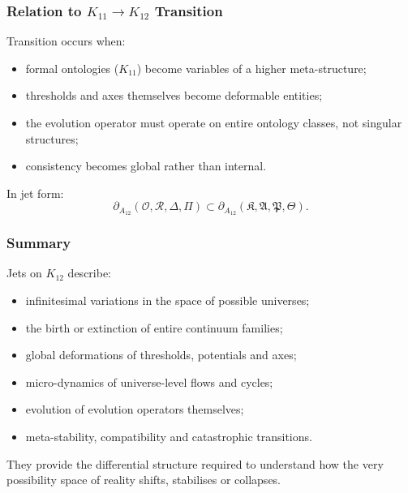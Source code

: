 \subsubsection{Relation to $K_{11} \to K_{12}$ Transition}

Transition occurs when:
\begin{itemize}
    \item formal ontologies ($K_{11}$) become variables of a higher
          meta-structure;
    \item thresholds and axes themselves become deformable entities;
    \item the evolution operator must operate on entire ontology classes,
          not singular structures;
    \item consistency becomes global rather than internal.
\end{itemize}

In jet form:
\[
\partial_{A_{12}}(\mathcal{O},\mathcal{R},\Delta,\Pi) 
\subset
\partial_{A_{12}}(\mathfrak{K},\mathfrak{A},\mathfrak{P},\mathfrak{\Theta}).
\]


\subsubsection{Summary}

Jets on $K_{12}$ describe:
\begin{itemize}
    \item infinitesimal variations in the space of possible universes;
    \item the birth or extinction of entire continuum families;
    \item global deformations of thresholds, potentials and axes;
    \item micro-dynamics of universe-level flows and cycles;
    \item evolution of evolution operators themselves;
    \item meta-stability, compatibility and catastrophic transitions.
\end{itemize}

They provide the differential structure required to understand how the
very possibility space of reality shifts, stabilises or collapses.
